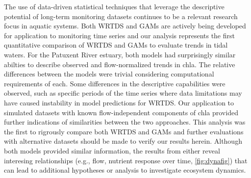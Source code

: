 \documentclass{svjour3}\usepackage[]{graphicx}\usepackage[]{color}
\begin{document}
The use of data-driven statistical techniques that leverage the descriptive potential of long-term monitoring datasets continues to be a relevant research focus in aquatic systems.  Both \ac{WRTDS} and \acp{GAM} are actively being developed for application to monitoring time series and our analysis represents the first quantitative comparison of \ac{WRTDS} and \acp{GAM} to evaluate trends in tidal waters.  For the Patuxent River estuary, both models had surprisingly similar abilties to describe observed and flow-normalized trends in \ac{chla}.  The relative differences between the models were trivial considering computational requirements of each.  Some differences in the descriptive capabilities were observed, such as specific periods of the time series where data limitations may have caused instability in model predictions for \ac{WRTDS}.  Our application to simulated datasets with known flow-independent components of \ac{chla} provided further indications of similarities between the two approaches. This analysis was the first to rigrously compare both \ac{WRTDS} and \acp{GAM} and further evaluations with alternative datasets should be made to verify our results herein. Although both models provided similar information, the results from either reveal interesing relationships (e.g., flow, nutrient response over time, \cref{fig:dynafig}) that can lead to additional hypotheses or analysis to investigate ecosystem dynamics.
\end{document}
